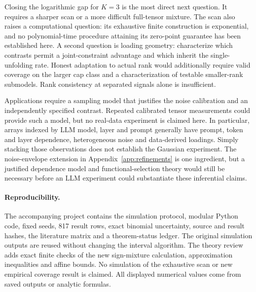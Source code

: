 \documentclass[11pt]{article}
\theoremstyle{remark}
\begin{document}
Closing the logarithmic gap for $K=3$ is the most direct next question. It requires a sharper scan or a more difficult full-tensor mixture. The scan also raises a computational question: its exhaustive finite construction is exponential, and no polynomial-time procedure attaining its zero-point guarantee has been established here. A second question is loading geometry: characterize which contrasts permit a joint-constraint advantage and which inherit the single-unfolding rate. Honest adaptation to actual rank would additionally require valid coverage on the larger cap class and a characterization of testable smaller-rank submodels. Rank consistency at separated signals alone is insufficient.

Applications require a sampling model that justifies the noise calibration and an independently specified contrast. Repeated calibrated tensor measurements could provide such a model, but no real-data experiment is claimed here. In particular, arrays indexed by LLM model, layer and prompt generally have prompt, token and layer dependence, heterogeneous noise and data-derived loadings. Simply stacking those observations does not establish the Gaussian experiment. The noise-envelope extension in Appendix~\ref{app:refinements} is one ingredient, but a justified dependence model and functional-selection theory would still be necessary before an LLM experiment could substantiate these inferential claims.

\paragraph{Reproducibility.}
The accompanying project contains the simulation protocol, modular Python code, fixed seeds, 817 result rows, exact binomial uncertainty, source and result hashes, the literature matrix and a theorem-status ledger. The original simulation outputs are reused without changing the interval algorithm. The theory review adds exact finite checks of the new sign-mixture calculation, approximation inequalities and affine bounds. No simulation of the exhaustive scan or new empirical coverage result is claimed. All displayed numerical values come from saved outputs or analytic formulas.

\appendix






\end{document}
